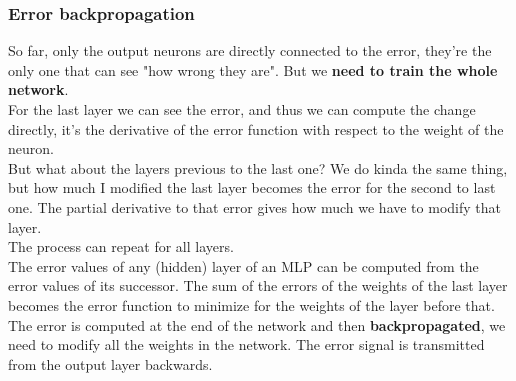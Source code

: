 \newpage

\subsubsection{Error backpropagation}
So far, only the output neurons are directly connected to the error, they're the only one that can see "how wrong they are". But we \textbf{need to train the whole network}.\\

For the last layer we can see the error, and thus we can compute the change directly, it's the derivative of the error function with respect to the weight of the neuron.\\
But what about the layers previous to the last one? We do kinda the same thing, but how much I modified the last layer becomes the error for the second to last one. The partial derivative to that error gives how much we have to modify that layer.\\
The process can repeat for all layers.\\

The error values of any (hidden) layer of an MLP can be computed from the error values of its successor. The sum of the errors of the weights of the last layer becomes the error function to minimize for the weights of the layer before that.\\

The error is computed at the end of the network and then \textbf{backpropagated}, we need to modify all the weights in the network. The error signal is transmitted from the output layer backwards.\\

\newpage

